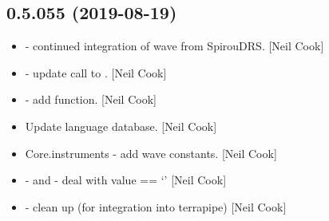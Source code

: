\documentclass[a4paper,10pt,english]{report}
\begin{document}
\subsection{0.5.055 (2019-08-19)}
\label{\detokenize{misc/changelog:id88}}\begin{itemize}
\item {} 
 - continued integration of wave from SpirouDRS.
{[}Neil Cook{]}

\item {} 
 - update call to . {[}Neil Cook{]}

\item {} 
 - add  function. {[}Neil Cook{]}

\item {} 
Update language database. {[}Neil Cook{]}

\item {} 
Core.instruments - add wave constants. {[}Neil Cook{]}

\item {} 
 -  and
 - deal with value == ‘’ {[}Neil Cook{]}

\item {} 
 - clean up (for integration into terrapipe) {[}Neil Cook{]}

\end{itemize}
\end{document}
